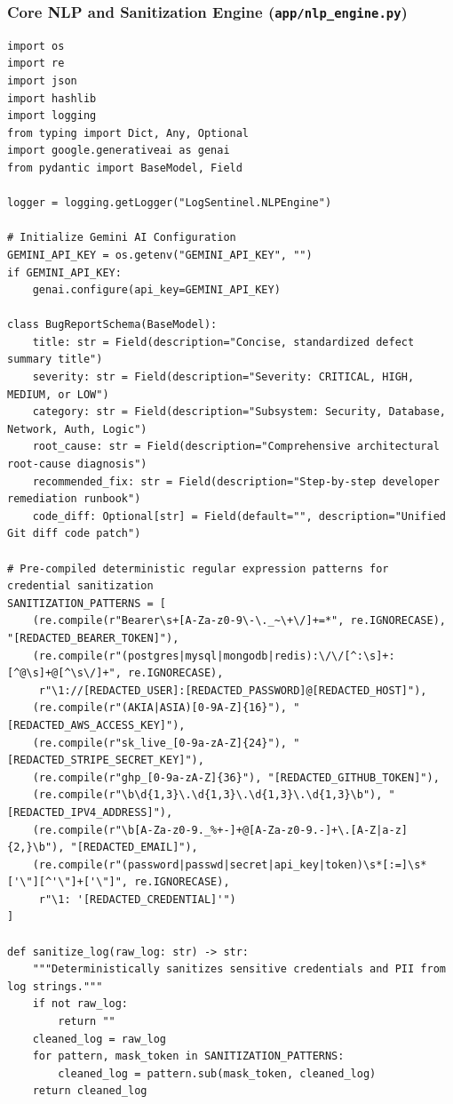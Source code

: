 \documentclass[12pt,a4paper]{article}
\begin{document}
\subsubsection{Core NLP and Sanitization Engine (\texttt{app/nlp\_engine.py})}
\begin{lstlisting}[style=pystyle, caption={Production NLP Sanitization, Deduplication, and Gemini AI Triage Engine}]
import os
import re
import json
import hashlib
import logging
from typing import Dict, Any, Optional
import google.generativeai as genai
from pydantic import BaseModel, Field

logger = logging.getLogger("LogSentinel.NLPEngine")

# Initialize Gemini AI Configuration
GEMINI_API_KEY = os.getenv("GEMINI_API_KEY", "")
if GEMINI_API_KEY:
    genai.configure(api_key=GEMINI_API_KEY)

class BugReportSchema(BaseModel):
    title: str = Field(description="Concise, standardized defect summary title")
    severity: str = Field(description="Severity: CRITICAL, HIGH, MEDIUM, or LOW")
    category: str = Field(description="Subsystem: Security, Database, Network, Auth, Logic")
    root_cause: str = Field(description="Comprehensive architectural root-cause diagnosis")
    recommended_fix: str = Field(description="Step-by-step developer remediation runbook")
    code_diff: Optional[str] = Field(default="", description="Unified Git diff code patch")

# Pre-compiled deterministic regular expression patterns for credential sanitization
SANITIZATION_PATTERNS = [
    (re.compile(r"Bearer\s+[A-Za-z0-9\-\._~\+\/]+=*", re.IGNORECASE), "[REDACTED_BEARER_TOKEN]"),
    (re.compile(r"(postgres|mysql|mongodb|redis):\/\/[^:\s]+:[^@\s]+@[^\s\/]+", re.IGNORECASE),
     r"\1://[REDACTED_USER]:[REDACTED_PASSWORD]@[REDACTED_HOST]"),
    (re.compile(r"(AKIA|ASIA)[0-9A-Z]{16}"), "[REDACTED_AWS_ACCESS_KEY]"),
    (re.compile(r"sk_live_[0-9a-zA-Z]{24}"), "[REDACTED_STRIPE_SECRET_KEY]"),
    (re.compile(r"ghp_[0-9a-zA-Z]{36}"), "[REDACTED_GITHUB_TOKEN]"),
    (re.compile(r"\b\d{1,3}\.\d{1,3}\.\d{1,3}\.\d{1,3}\b"), "[REDACTED_IPV4_ADDRESS]"),
    (re.compile(r"\b[A-Za-z0-9._%+-]+@[A-Za-z0-9.-]+\.[A-Z|a-z]{2,}\b"), "[REDACTED_EMAIL]"),
    (re.compile(r"(password|passwd|secret|api_key|token)\s*[:=]\s*['\"][^'\"]+['\"]", re.IGNORECASE),
     r"\1: '[REDACTED_CREDENTIAL]'")
]

def sanitize_log(raw_log: str) -> str:
    """Deterministically sanitizes sensitive credentials and PII from log strings."""
    if not raw_log:
        return ""
    cleaned_log = raw_log
    for pattern, mask_token in SANITIZATION_PATTERNS:
        cleaned_log = pattern.sub(mask_token, cleaned_log)
    return cleaned_log


\end{lstlisting}
\end{document}
